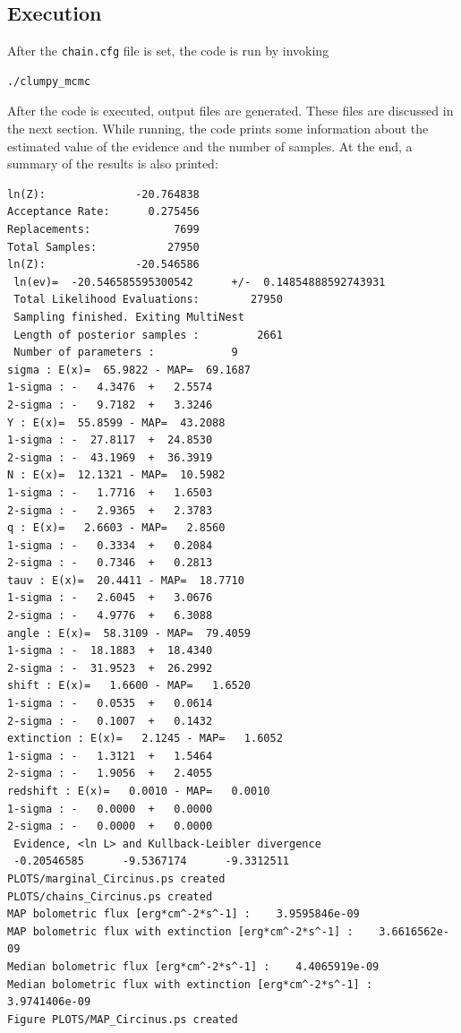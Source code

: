 \documentclass[12pt]{article}
\begin{document}
\subsection{Execution}
\label{sec:execution}
After the \texttt{chain.cfg} file is set, the code is run by invoking
\begin{verbatim}
./clumpy_mcmc
\end{verbatim}
After the code is executed, output files are generated. These files are discussed in the
next section. While running, the code prints some information about the estimated
value of the evidence and the number of samples. At the end, a summary of the
results is also printed:
\begin{scriptsize}
\begin{verbatim}
ln(Z):              -20.764838
Acceptance Rate:      0.275456
Replacements:             7699
Total Samples:           27950
ln(Z):              -20.546586
 ln(ev)=  -20.546585595300542      +/-  0.14854888592743931     
 Total Likelihood Evaluations:        27950
 Sampling finished. Exiting MultiNest
 Length of posterior samples :         2661
 Number of parameters :            9
sigma : E(x)=  65.9822 - MAP=  69.1687
1-sigma : -   4.3476  +   2.5574
2-sigma : -   9.7182  +   3.3246
Y : E(x)=  55.8599 - MAP=  43.2088
1-sigma : -  27.8117  +  24.8530
2-sigma : -  43.1969  +  36.3919
N : E(x)=  12.1321 - MAP=  10.5982
1-sigma : -   1.7716  +   1.6503
2-sigma : -   2.9365  +   2.3783
q : E(x)=   2.6603 - MAP=   2.8560
1-sigma : -   0.3334  +   0.2084
2-sigma : -   0.7346  +   0.2813
tauv : E(x)=  20.4411 - MAP=  18.7710
1-sigma : -   2.6045  +   3.0676
2-sigma : -   4.9776  +   6.3088
angle : E(x)=  58.3109 - MAP=  79.4059
1-sigma : -  18.1883  +  18.4340
2-sigma : -  31.9523  +  26.2992
shift : E(x)=   1.6600 - MAP=   1.6520
1-sigma : -   0.0535  +   0.0614
2-sigma : -   0.1007  +   0.1432
extinction : E(x)=   2.1245 - MAP=   1.6052
1-sigma : -   1.3121  +   1.5464
2-sigma : -   1.9056  +   2.4055
redshift : E(x)=   0.0010 - MAP=   0.0010
1-sigma : -   0.0000  +   0.0000
2-sigma : -   0.0000  +   0.0000
 Evidence, <ln L> and Kullback-Leibler divergence
 -0.20546585      -9.5367174      -9.3312511    
PLOTS/marginal_Circinus.ps created
PLOTS/chains_Circinus.ps created
MAP bolometric flux [erg*cm^-2*s^-1] :    3.9595846e-09
MAP bolometric flux with extinction [erg*cm^-2*s^-1] :    3.6616562e-09
Median bolometric flux [erg*cm^-2*s^-1] :    4.4065919e-09
Median bolometric flux with extinction [erg*cm^-2*s^-1] :    3.9741406e-09
Figure PLOTS/MAP_Circinus.ps created
\end{verbatim}
\end{scriptsize}
\end{document}

